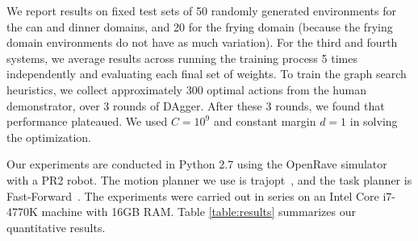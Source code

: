 We report results on fixed test sets of 50 randomly generated environments for the can and dinner domains,
and 20 for the frying domain (because the frying domain environments do not have as much variation).
For the third and fourth systems, we average results across running the training
process 5 times independently and evaluating each final set of weights. To train the graph search heuristics,
we collect approximately 300 optimal actions from the human demonstrator, over 3 rounds of DAgger. After these 3 rounds,
we found that performance plateaued. We used $C = 10^{9}$ and constant margin $d = 1$ in solving the optimization.

Our experiments are conducted in Python 2.7 using the OpenRave simulator~\cite{Diankov_2008_6117} with a PR2 robot.
The motion planner we use is trajopt~\cite{schulman2013finding}, and the task planner is Fast-Forward~\cite{FF}.
The experiments were carried out in series on an Intel Core i7-4770K machine with 16GB RAM.
Table \ref{table:results} summarizes our quantitative results.

